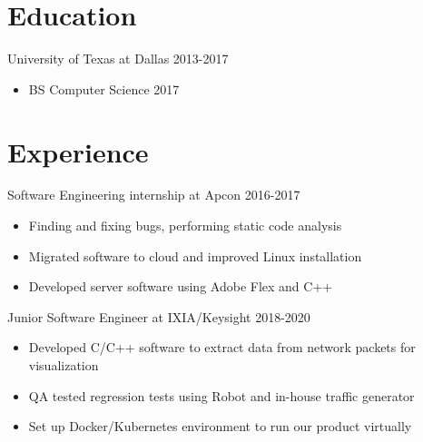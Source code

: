 \documentclass[line,margin]{res}
\begin{document}
	\address{(512)574-6609 |
	\href{mailto:blakerandall0@gmail.com}{blakerandall0@gmail.com}}

\begin{resume}

\vspace{8pt}

\vspace{-4pt}
\section{Education}
\vspace{12pt}
University of Texas at Dallas \hfill 2013-2017 \\
\vspace{-12pt}
	\begin{itemize} \itemsep -2pt
	\item BS Computer Science 2017
	\end{itemize}

\vspace{-4pt}
\section{Experience}
\vspace{12pt}
Software Engineering internship at Apcon
\hfill 2016-2017
	\begin{itemize} \itemsep -2pt
	\item Finding and fixing bugs, performing static code analysis
	\item Migrated software to cloud and improved Linux installation
	\item Developed server software using Adobe Flex and C++
	\end{itemize}

Junior Software Engineer at IXIA/Keysight
\hfill 2018-2020
	\begin{itemize} \itemsep -2pt
	\item Developed C/C++ software to extract data from network packets for visualization
	\item QA tested regression tests using Robot and in-house traffic generator
	\item Set up Docker/Kubernetes environment to run our product virtually
	\end{itemize}


\end{resume}
\end{document}
